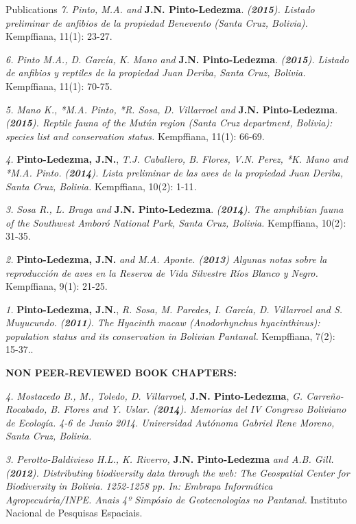 \documentclass{resume} %
\begin{document}
\begin{rSection}{Publications}
{\em 7.} {\em *Pinto, M.A. and} {\bf{J.N. Pinto-Ledezma}}. {\em ({{\bf 2015}}). Listado preliminar de anfibios de la propiedad Benevento (Santa Cruz, Bolivia).} {Kempffiana, 11(1): 23-27}.

{\em 6.} {\em *Pinto M.A., D. García, K. Mano and} {\bf{J.N. Pinto-Ledezma}}. {\em ({{\bf 2015}}). Listado de anfibios y reptiles de la propiedad Juan Deriba, Santa Cruz, Bolivia.} {Kempffiana, 11(1): 70-75}.

{\em 5.} {\em *Mano K., *M.A. Pinto, *R. Sosa, D. Villarroel and} {\bf{J.N. Pinto-Ledezma}}. {\em ({{\bf 2015}}). Reptile fauna of the Mutún region (Santa Cruz department, Bolivia): species list and conservation status.} {Kempffiana, 11(1): 66-69}.

{\em 4.} {\bf{Pinto-Ledezma, J.N.}}, {\em T.J. Caballero, B. Flores, V.N. Perez, *K. Mano and *M.A. Pinto. ({{\bf 2014}}). Lista preliminar de las aves de la propiedad Juan Deriba, Santa Cruz, Bolivia.} {Kempffiana, 10(2): 1-11}.

{\em 3.} {\em *Sosa R., L. Braga and} {\bf{J.N. Pinto-Ledezma}}. {\em ({{\bf 2014}}). The amphibian fauna of the Southwest Amboró National Park, Santa Cruz, Bolivia.} {Kempffiana, 10(2): 31-35}.

{\em 2.} {\bf{Pinto-Ledezma, J.N.}} {\em and M.A. Aponte. ({{\bf 2013}}) Algunas notas sobre la reproducción de aves en la Reserva de Vida Silvestre Ríos Blanco y Negro.} {Kempffiana, 9(1): 21-25}.

{\em 1.} {\bf{Pinto-Ledezma, J.N.}}, {\em R. Sosa, M. Paredes, I. García, D. Villarroel and S. Muyucundo. ({{\bf 2011}}). The Hyacinth macaw ({\em Anodorhynchus hyacinthinus}): population status and its conservation in Bolivian Pantanal.} {Kempffiana, 7(2): 15-37.}. 

{\bf NON PEER-REVIEWED BOOK CHAPTERS:}

{\em 4.} {\em Mostacedo B., M., Toledo, D. Villarroel,} {\bf{J.N. Pinto-Ledezma}}, {\em G. Carreño-Rocabado, B. Flores and Y. Uslar. ({{\bf 2014}}). Memorias del IV Congreso Boliviano de Ecología. 4-6 de Junio 2014. Universidad Autónoma Gabriel Rene Moreno, Santa Cruz, Bolivia.}

{\em 3.} {\em Perotto-Baldivieso H.L., K. Riverro, } {\bf{J.N. Pinto-Ledezma}} {\em and A.B. Gill. ({{\bf 2012}}). Distributing biodiversity data through the web: The Geospatial Center for Biodiversity in Bolivia. 1252-1258 pp. In: Embrapa Informática Agropecuária/INPE. Anais 4º Simpósio de Geotecnologias no Pantanal.} {Instituto Nacional de Pesquisas Espaciais.} 


\end{rSection}
\end{document}
